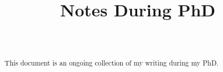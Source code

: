 \documentclass[aos,preprint]{imsart}
\numberwithin{equation}{section}
\begin{document}
\begin{frontmatter}
\title{Notes During PhD}

\begin{aug}
\author[A]{~ }
\address[A]{Centrum Wiskunde \& Informatica, Amsterdam, The Netherlands.}
\end{aug}

\end{frontmatter}


\tableofcontents

\begin{abstract}
    \noindent
    This document is an ongoing collection of my writing during my PhD.
\end{abstract}














\clearpage

\nocite{*}



\end{document}
